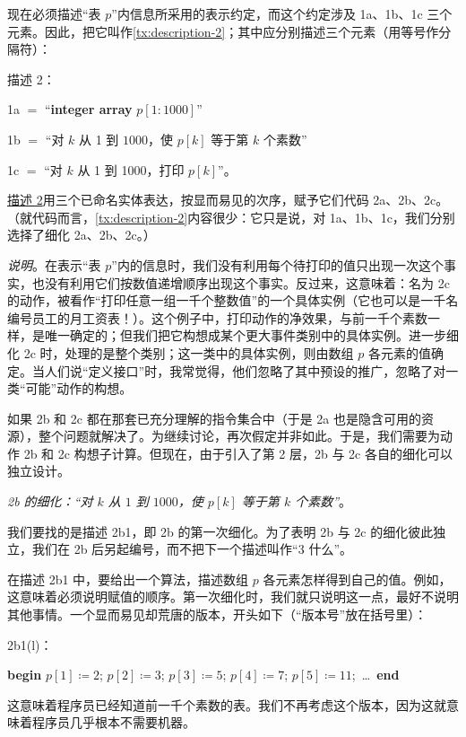 现在必须描述“表 $p$”内信息所采用的表示约定，而这个约定涉及 1a、1b、1c 三个元素。因此，把它叫作\ref{tx:description-2}；其中应分别描述三个元素（用等号作分隔符）：
\medskip

\noindent
描述 2：
\nopagebreak

\noindent
1a $=$ “\textbf{integer array} $p[1 : 1000]$”

\noindent
1b $=$ “对 $k$ 从 1 到 $1000$，使 $p[k]$ 等于第 $k$ 个素数”

\noindent
1c $=$ “对 $k$ 从 1 到 1000，打印 $p[k]$”。

\hyperref[tx:description-2]{描述 2}用三个已命名实体表达，按显而易见的次序，赋予它们代码 2a、2b、2c。（就代码而言，\ref{tx:description-2}内容很少：它只是说，对 1a、1b、1c，我们分别选择了细化 2a、2b、2c。）

\noindent
\textit{说明}。在表示“表 $p$”内的信息时，我们没有利用每个待打印的值只出现一次这个事实，也没有利用它们按数值递增顺序出现这个事实。反过来，这意味着：名为 2c 的动作，被看作“打印任意一组一千个整数值”的一个具体实例（它也可以是一千名编号员工的月工资表！）。这个例子中，打印动作的净效果，与前一千个素数一样，是唯一确定的；但我们把它构想成某个更大事件类别中的具体实例。进一步细化 2c 时，处理的是整个类别；这一类中的具体实例，则由数组 $p$ 各元素的值确定。当人们说“定义接口”时，我常觉得，他们忽略了其中预设的推广，忽略了对一类“可能”动作的构想。

如果 2b 和 2c 都在那套已充分理解的指令集合中（于是 2a 也是隐含可用的资源），整个问题就解决了。为继续讨论，再次假定并非如此。于是，我们需要为动作 2b 和 2c 构想子计算。但现在，由于引入了第 2 层，2b 与 2c 各自的细化可以独立设计。

\emph{2b 的细化：“对 $k$ 从 $1$ 到 $1000$，使 $p[k]$ 等于第 $k$ \emph{个}素数”}。

我们要找的是描述 2b1，即 2b 的第一次细化。为了表明 2b 与 2c 的细化彼此独立，我们在 2b 后另起编号，而不把下一个描述叫作“3 什么”。

在描述 2b1 中，要给出一个算法，描述数组 $p$ 各元素怎样得到自己的值。例如，这意味着必须说明赋值的顺序。第一次细化时，我们就只说明这一点，最好不说明其他事情。一个显而易见却荒唐的版本，开头如下（“版本号”放在括号里）：

\noindent
2b1(l)：
\nopagebreak

\noindent
\textbf{begin} $p[1] \coloneq 2$; $p[2] \coloneq 3$; $p[3] \coloneq 5$; $p[4] \coloneq 7$; $p[5] \coloneq 11$;\ \dots\ \textbf{end}

\noindent
这意味着程序员已经知道前一千个素数的表。我们不再考虑这个版本，因为这就意味着程序员几乎根本不需要机器。


